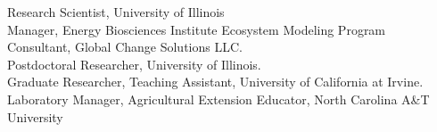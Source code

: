 \documentclass{xetexCV}
\begin{document}
\makecvtitle 







  





Research Scientist, University of Illinois\\
Manager, Energy Biosciences Institute Ecosystem Modeling Program\\
Consultant, Global Change Solutions LLC.\\





Postdoctoral Researcher, University of Illinois.\\ 


Graduate Researcher, Teaching Assistant, University of California at Irvine. \\

Laboratory Manager, Agricultural Extension Educator,  North Carolina A\&T University \\
\end{document}
